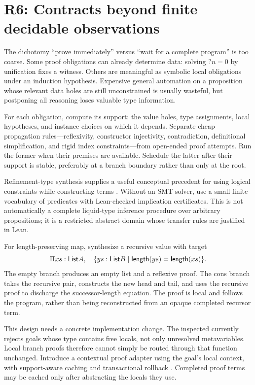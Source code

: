 \section{R6: Contracts beyond finite decidable observations}\label{sec:r6}


The dichotomy ``prove immediately'' versus ``wait for a complete program'' is
too coarse. Some proof obligations can already determine data: solving
$?n=0$ by unification fixes a witness. Others are meaningful as symbolic local
obligations under an induction hypothesis. Expensive general automation on a
proposition whose relevant data holes are still unconstrained is usually
wasteful, but postponing all reasoning loses valuable type information.

For each obligation, compute its support: the value holes, type assignments,
local hypotheses, and instance choices on which it depends. Separate cheap
propagation rules---reflexivity, constructor injectivity, contradiction,
definitional simplification, and rigid index constraints---from open-ended
proof attempts. Run the former when their premises are available. Schedule
the latter after their support is stable, preferably at a branch boundary
rather than only at the root.

Refinement-type synthesis supplies a useful conceptual precedent for using
logical constraints while constructing terms \cite{synquid}. Without an SMT
solver, use a small finite vocabulary of predicates with Lean-checked
implication certificates. This is not automatically a complete liquid-type
inference procedure over arbitrary propositions; it is a restricted abstract
domain whose transfer rules are justified in Lean.

For length-preserving map, synthesize a recursive value with target
\[
 \Pi xs:\mathsf{List} A,\quad
 \{ys:\mathsf{List} B\mid \mathsf{length}(ys)=\mathsf{length}(xs)\}.
\]
The empty branch produces an empty list and a reflexive proof. The cons
branch takes the recursive pair, constructs the new head and tail, and uses
the recursive proof to discharge the successor-length equation. The proof is
local and follows the program, rather than being reconstructed from an opaque
completed recursor term.

This design needs a concrete implementation change. The inspected
 currently rejects goals whose type contains free locals,
not only unresolved metavariables. Local branch proofs therefore cannot simply
be routed through that function unchanged. Introduce a contextual proof
adapter using the goal's local context, with support-aware caching and
transactional rollback \cite{searchcode}. Completed proof terms may be cached
only after abstracting the locals they use.

